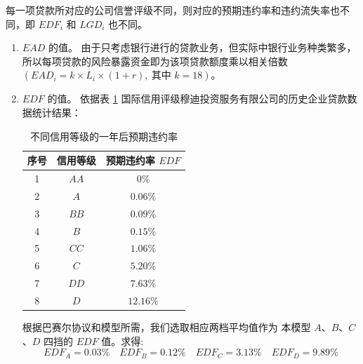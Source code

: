 \documentclass[withoutpreface,bwprint]{cumcmthesis}
\begin{document}
\begin{enumerate}
                  每一项贷款所对应的公司信誉评级不同，则对应的预期违约率和违约流失率也不同，即 $EDF_i$ 和 $LGD_i$ 也不同。
                  \begin{enumerate}
                      \item $EAD$ 的值。
                            由于只考虑银行进行的贷款业务，但实际中银行业务种类繁多，所以每项贷款的风险暴露资金即为该项贷款额度乘以相关倍数
                            $(EAD_i = k \times L_i \times (1 + r), \ \text{其中\ } k = 18 )$。
                      \item $EDF$ 的值。
                            依据表 \ref{表：不同信用等级的一年后预期违约率} 国际信用评级穆迪投资服务有限公司的历史企业贷款数据统计结果：\par
                        \begin{table}[H]\begin{center}
                            \begin{tabular}{|c|c|c|}
                                \hline
                                序号 & 信用等级 & 预期违约率 $EDF$ \\
                                \hline
                                1   & $AA$ & $0 \%$ \\
                                2   & $A$  & $0.06 \%$ \\
                                3   & $BB$ & $0.09 \%$ \\
                                4   & $B$  & $0.15 \%$ \\
                                5   & $CC$ & $1.06 \%$ \\
                                6   & $C$  & $5.20 \%$ \\
                                7   & $DD$ & $7.63 \%$ \\
                                8   & $D$  & $12.16 \%$ \\ 
                                \hline                               
                            \end{tabular}
                            \caption{不同信用等级的一年后预期违约率}
                            \label {表：不同信用等级的一年后预期违约率}
                        \end{center}\end{table}
                        根据巴赛尔协议和模型所需，我们选取相应两档平均值作为
                        本模型 $A$、$B$、$C$、$D$ 四挡的 $EDF$ 值。求得:
                        \[
                            EDF_A = 0.03 \% \quad EDF_B = 0.12 \% \quad EDF_C = 3.13 \% \quad EDF_D = 9.89 \%
\]
\end{enumerate}
\end{enumerate}
\end{document}
